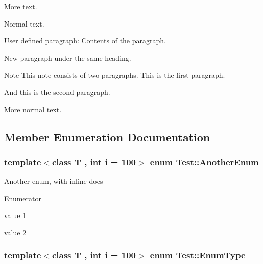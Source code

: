 More text.

Normal text.

\begin{DoxyParagraph}{User defined paragraph\-:}
Contents of the paragraph.
\end{DoxyParagraph}
\begin{DoxyParagraph}{}
New paragraph under the same heading.
\end{DoxyParagraph}
\begin{DoxyNote}{Note}
This note consists of two paragraphs. This is the first paragraph.
\end{DoxyNote}
\begin{DoxyParagraph}{}
And this is the second paragraph.
\end{DoxyParagraph}
More normal text. 

\subsection{Member Enumeration Documentation}
\hypertarget{classTest_a34b5b35cdcd492c108e62275d647bcf4}{
\subsubsection[{Another\-Enum}]{\setlength{\rightskip}{0pt plus 5cm}template$<$class T , int i = 100$>$ enum {\bf Test\-::\-Another\-Enum}}}\label{classTest_a34b5b35cdcd492c108e62275d647bcf4}
Another enum, with inline docs \begin{Desc}
\item[Enumerator]\par
\begin{description}
\item[{\em 
\hypertarget{classTest_a34b5b35cdcd492c108e62275d647bcf4a5e2c48aa2737365d177cfd29c88341f7}{V1}\label{classTest_a34b5b35cdcd492c108e62275d647bcf4a5e2c48aa2737365d177cfd29c88341f7}
}]value 1 \item[{\em 
\hypertarget{classTest_a34b5b35cdcd492c108e62275d647bcf4adb6734947779033dd3662483baa57be8}{V2}\label{classTest_a34b5b35cdcd492c108e62275d647bcf4adb6734947779033dd3662483baa57be8}
}]value 2 \end{description}
\end{Desc}
\hypertarget{classTest_a26bf93efdaea3c6e2cfa4119c3755d3f}{
\subsubsection[{Enum\-Type}]{\setlength{\rightskip}{0pt plus 5cm}template$<$class T , int i = 100$>$ enum {\bf Test\-::\-Enum\-Type}}}\label{classTest_a26bf93efdaea3c6e2cfa4119c3755d3f}

